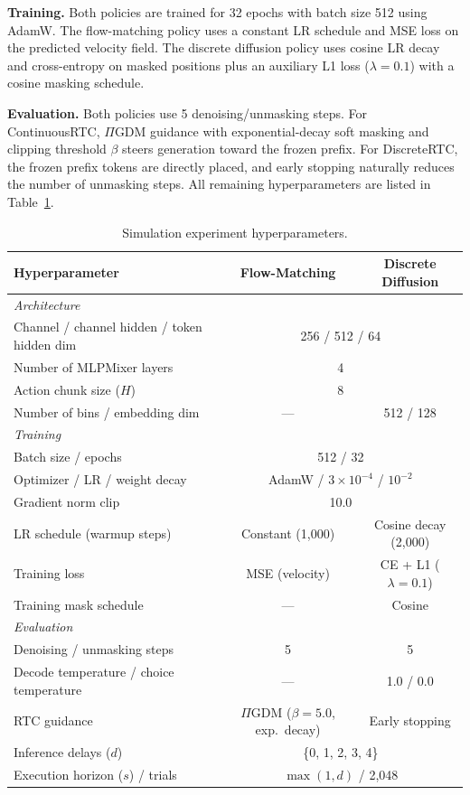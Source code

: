 \documentclass{article}
\begin{document}
\textbf{Training.}
Both policies are trained for 32 epochs with batch size 512 using AdamW.
The flow-matching policy uses a constant LR schedule and MSE loss on the predicted velocity field.
The discrete diffusion policy uses cosine LR decay and cross-entropy on masked positions plus an auxiliary L1 loss ($\lambda{=}0.1$) with a cosine masking schedule.

\textbf{Evaluation.}
Both policies use 5 denoising/unmasking steps.
For ContinuousRTC, $\Pi$GDM guidance with exponential-decay soft masking and clipping threshold $\beta$ steers generation toward the frozen prefix.
For DiscreteRTC, the frozen prefix tokens are directly placed, and early stopping naturally reduces the number of unmasking steps.
All remaining hyperparameters are listed in Table~\ref{tab:hyperparams_sim}.

\begin{table}[h]
\centering
\caption{Simulation experiment hyperparameters.}
\label{tab:hyperparams_sim}
\begin{tabular}{lcc}
\toprule
\textbf{Hyperparameter} & \textbf{Flow-Matching} & \textbf{Discrete Diffusion} \\
\midrule
\multicolumn{3}{l}{\textit{Architecture}} \\
Channel / channel hidden / token hidden dim & \multicolumn{2}{c}{256 / 512 / 64} \\
Number of MLPMixer layers & \multicolumn{2}{c}{4} \\
Action chunk size ($H$) & \multicolumn{2}{c}{8} \\
Number of bins / embedding dim & --- & 512 / 128 \\
\midrule
\multicolumn{3}{l}{\textit{Training}} \\
Batch size / epochs & \multicolumn{2}{c}{512 / 32} \\
Optimizer / LR / weight decay & \multicolumn{2}{c}{AdamW / $3 \times 10^{-4}$ / $10^{-2}$} \\
Gradient norm clip & \multicolumn{2}{c}{10.0} \\
LR schedule (warmup steps) & Constant (1{,}000) & Cosine decay (2{,}000) \\
Training loss & MSE (velocity) & CE + L1 ($\lambda{=}0.1$) \\
Training mask schedule & --- & Cosine \\
\midrule
\multicolumn{3}{l}{\textit{Evaluation}} \\
Denoising / unmasking steps & 5 & 5 \\
Decode temperature / choice temperature & --- & 1.0 / 0.0 \\
RTC guidance & $\Pi$GDM ($\beta{=}5.0$, exp.\ decay) & Early stopping \\
Inference delays ($d$) & \multicolumn{2}{c}{\{0, 1, 2, 3, 4\}} \\
Execution horizon ($s$) / trials & \multicolumn{2}{c}{$\max(1, d)$ / 2{,}048} \\
\bottomrule
\end{tabular}
\end{table}
\end{document}
